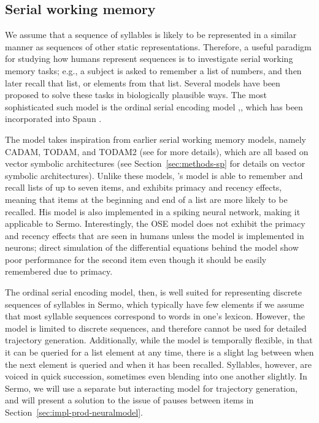\subsection{Serial working memory}

We assume that a sequence of syllables
is likely to be represented
in a similar manner
as sequences of other static representations.
Therefore, a useful paradigm for studying
how humans represent sequences
is to investigate serial working memory tasks;
e.g., a subject is asked to remember
a list of numbers,
and then later recall that list,
or elements from that list.
Several models have been proposed
to solve these tasks
in biologically plausible ways.
The most sophisticated such model
is the ordinal serial encoding model
\citep{choo2010},,
which has been incorporated into
Spaun \citep{eliasmith2012}.

The model takes inspiration from
earlier serial working memory models,
namely CADAM, TODAM, and TODAM2
(see \citealt{choo2010} for more details),
which are all based on
vector symbolic architectures
(see Section~\ref{sec:methods-sp}
for details on vector symbolic architectures).
Unlike these models,
\citeauthor{choo2010}'s model
is able to remember and recall
lists of up to seven items,
and exhibits primacy and recency effects,
meaning that items at the beginning
and end of a list are more likely
to be recalled.
His model is also implemented
in a spiking neural network,
making it applicable to Sermo.
Interestingly,
the OSE model does not exhibit
the primacy and recency effects
that are seen in humans
unless the model
is implemented in neurons;
direct simulation of the differential equations
behind the model show
poor performance for the second item
even though it should be easily remembered
due to primacy.

The ordinal serial encoding model,
then, is well suited for representing
discrete sequences of syllables in Sermo,
which typically have few elements
if we assume that most syllable sequences
correspond to words in one's lexicon.
However, the model is limited to
discrete sequences,
and therefore cannot be used
for detailed trajectory generation.
Additionally,
while the model is temporally flexible,
in that it can be queried for
a list element at any time,
there is a slight lag between
when the next element is queried
and when it has been recalled.
Syllables, however, are voiced in quick succession,
sometimes even blending into one another slightly.
In Sermo, we will use a separate but interacting model
for trajectory generation,
and will present a solution
to the issue of pauses between items
in Section~\ref{sec:impl-prod-neuralmodel}.


